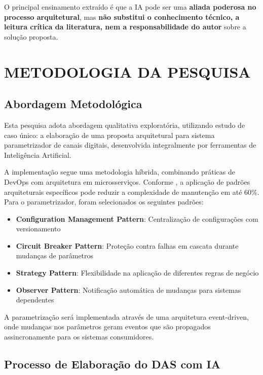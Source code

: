 O principal ensinamento extraído é que a IA pode ser uma \textbf{aliada poderosa no processo arquitetural}, mas \textbf{não substitui o conhecimento técnico, a leitura crítica da literatura, nem a responsabilidade do autor} sobre a solução proposta.

\chapter{METODOLOGIA DA PESQUISA}

\section{Abordagem Metodológica}

Esta pesquisa adota abordagem qualitativa exploratória, utilizando estudo de caso único: a elaboração de uma proposta arquitetural para sistema parametrizador de canais digitais, desenvolvida integralmente por ferramentas de Inteligência Artificial.

A implementação segue uma metodologia híbrida, combinando práticas de DevOps  com arquitetura em microsserviços. Conforme , a aplicação de padrões arquiteturais específicos pode reduzir a complexidade de manutenção em até 60\%. Para o parametrizador, foram selecionados os seguintes padrões:

\begin{itemize}
    \item \textbf{Configuration Management Pattern}: Centralização de configurações com versionamento
    \item \textbf{Circuit Breaker Pattern}: Proteção contra falhas em cascata durante mudanças de parâmetros
    \item \textbf{Strategy Pattern}: Flexibilidade na aplicação de diferentes regras de negócio
    \item \textbf{Observer Pattern}: Notificação automática de mudanças para sistemas dependentes
\end{itemize}

A parametrização será implementada através de uma arquitetura event-driven, onde mudanças nos parâmetros geram eventos que são propagados assincronamente para os sistemas consumidores.

\section{Processo de Elaboração do DAS com IA}

